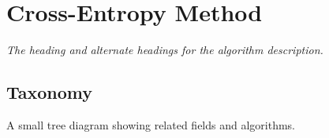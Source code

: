 

\section{Cross-Entropy Method} 
\label{sec:cross_entropy}

\emph{The heading and alternate headings for the algorithm description.}

\subsection{Taxonomy}
A small tree diagram showing related fields and algorithms.

